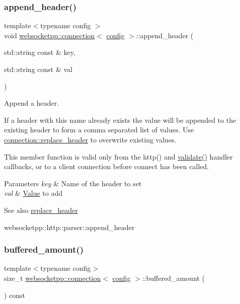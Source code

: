 \subsubsection{\texorpdfstring{append\+\_\+header()}{append\_header()}}
{\footnotesize\ttfamily template$<$typename config $>$ \\
void \mbox{\hyperlink{classwebsocketpp_1_1connection}{websocketpp\+::connection}}$<$ \mbox{\hyperlink{classconfig}{config}} $>$\+::append\+\_\+header (\begin{DoxyParamCaption}\item[{std\+::string const \&}]{key,  }\item[{std\+::string const \&}]{val }\end{DoxyParamCaption})}



Append a header. 

If a header with this name already exists the value will be appended to the existing header to form a comma separated list of values. Use {\ttfamily \mbox{\hyperlink{classwebsocketpp_1_1connection_a96e4adcdb9b3473ca96e2aac27ff7147}{connection\+::replace\+\_\+header}}} to overwrite existing values.

This member function is valid only from the http() and \mbox{\hyperlink{authority_8hpp_a98696231ed7d6f1c166797053cebc5eb}{validate()}} handler callbacks, or to a client connection before connect has been called.


\begin{DoxyParams}{Parameters}
{\em key} & Name of the header to set \\
\hline
{\em val} & \mbox{\hyperlink{struct_value}{Value}} to add \\
\hline
\end{DoxyParams}
\begin{DoxySeeAlso}{See also}
\mbox{\hyperlink{classwebsocketpp_1_1connection_a96e4adcdb9b3473ca96e2aac27ff7147}{replace\+\_\+header}} 

websocketpp\+::http\+::parser\+::append\+\_\+header 
\end{DoxySeeAlso}
\mbox{\label{classwebsocketpp_1_1connection_aaaad6dc1c81fc944593f529575b67d96}} 
\subsubsection{\texorpdfstring{buffered\+\_\+amount()}{buffered\_amount()}}
{\footnotesize\ttfamily template$<$typename config$>$ \\
size\+\_\+t \mbox{\hyperlink{classwebsocketpp_1_1connection}{websocketpp\+::connection}}$<$ \mbox{\hyperlink{classconfig}{config}} $>$\+::buffered\+\_\+amount (\begin{DoxyParamCaption}{ }\end{DoxyParamCaption}) const\hspace{0.3cm}{\ttfamily [inline]}}



